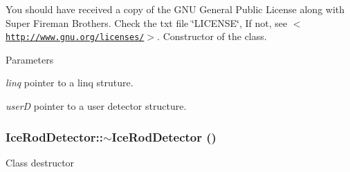 You should have received a copy of the GNU General Public License along with Super Fireman Brothers. Check the txt file \char`\"{}LICENSE\char`\"{}, If not, see $<$\href{http://www.gnu.org/licenses/}{\tt http://www.gnu.org/licenses/}$>$. Constructor of the class. 
\begin{DoxyParams}{Parameters}
\item[{\em linq}]pointer to a linq struture. \item[{\em userD}]pointer to a user detector structure. \end{DoxyParams}
\hypertarget{classIceRodDetector_ab4f8fa8f698cc77b09d80605c50659a6}{
\subsubsection[{$\sim$IceRodDetector}]{\setlength{\rightskip}{0pt plus 5cm}IceRodDetector::$\sim$IceRodDetector ()}}
\label{classIceRodDetector_ab4f8fa8f698cc77b09d80605c50659a6}
Class destructor 

